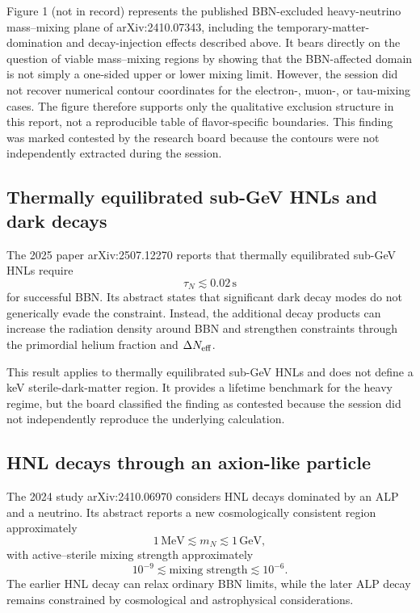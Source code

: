 \documentclass[11pt,a4paper]{article}
\begin{document}
Figure 1 (not in record) represents the published BBN-excluded heavy-neutrino mass--mixing plane of arXiv:2410.07343, including the temporary-matter-domination and decay-injection effects described above. It bears directly on the question of viable mass--mixing regions by showing that the BBN-affected domain is not simply a one-sided upper or lower mixing limit. However, the session did not recover numerical contour coordinates for the electron-, muon-, or tau-mixing cases. The figure therefore supports only the qualitative exclusion structure in this report, not a reproducible table of flavor-specific boundaries. This finding was marked contested by the research board because the contours were not independently extracted during the session.

\subsection{Thermally equilibrated sub-GeV HNLs and dark decays}

The 2025 paper arXiv:2507.12270 reports that thermally equilibrated sub-GeV HNLs require
\[
\tau_N\lesssim 0.02\,\mathrm{s}
\]
for successful BBN. Its abstract states that significant dark decay modes do not generically evade the constraint. Instead, the additional decay products can increase the radiation density around BBN and strengthen constraints through the primordial helium fraction and \(\Delta N_{\rm eff}\).

This result applies to thermally equilibrated sub-GeV HNLs and does not define a keV sterile-dark-matter region. It provides a lifetime benchmark for the heavy regime, but the board classified the finding as contested because the session did not independently reproduce the underlying calculation.

\subsection{HNL decays through an axion-like particle}

The 2024 study arXiv:2410.06970 considers HNL decays dominated by an ALP and a neutrino. Its abstract reports a new cosmologically consistent region approximately
\[
1\,\mathrm{MeV}\lesssim m_N\lesssim 1\,\mathrm{GeV},
\]
with active--sterile mixing strength approximately
\[
10^{-9}\lesssim \text{mixing strength}\lesssim10^{-6}.
\]
The earlier HNL decay can relax ordinary BBN limits, while the later ALP decay remains constrained by cosmological and astrophysical considerations.
\end{document}
